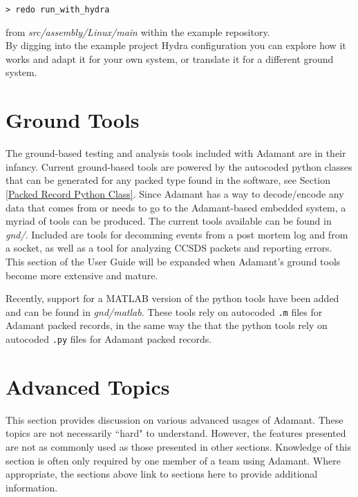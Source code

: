 \vspace{5mm} %
\begin{verbatim}
> redo run_with_hydra
\end{verbatim}
\vspace{5mm} %

from \textit{src/assembly/Linux/main} within the example repository. \\

By digging into the example project Hydra configuration you can explore how it works and adapt it for your own system, or translate it for a different ground system.

\newpage
\section{Ground Tools} \label{Ground Tools}

The ground-based testing and analysis tools included with Adamant are in their infancy. Current ground-based tools are powered by the autocoded python classes that can be generated for any packed type found in the software, see Section \ref{Packed Record Python Class}. Since Adamant has a way to decode/encode any data that comes from or needs to go to the Adamant-based embedded system, a myriad of tools can be produced. The current tools available can be found in \textit{gnd/}. Included are tools for decomming events from a post mortem log and from a socket, as well as a tool for analyzing CCSDS packets and reporting errors. This section of the User Guide will be expanded when Adamant's ground tools become more extensive and mature.

Recently, support for a MATLAB version of the python tools have been added and can be found in \textit{gnd/matlab}. These tools rely on autocoded \texttt{.m} files for Adamant packed records, in the same way the that the python tools rely on autocoded \texttt{.py} files for Adamant packed records.

\newpage
\section{Advanced Topics}

This section provides discussion on various advanced usages of Adamant. These topics are not necessarily ``hard" to understand. However, the features presented are not as commonly used as those presented in other sections. Knowledge of this section is often only required by one member of a team using Adamant. Where appropriate, the sections above link to sections here to provide additional information.

